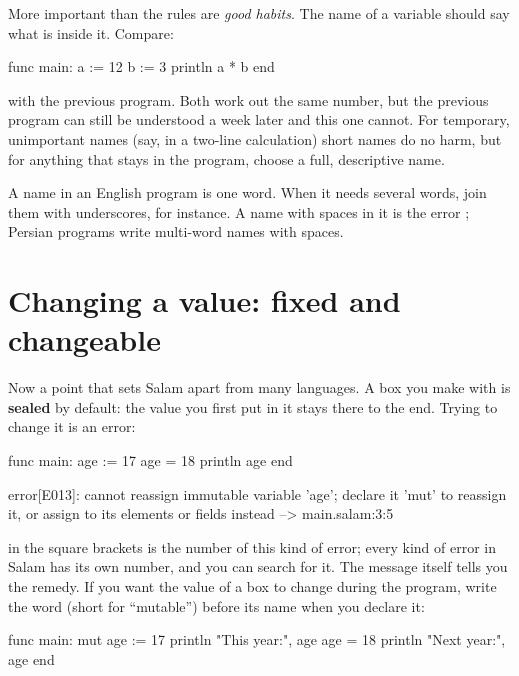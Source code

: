 More important than the rules are \emph{good habits}. The name of a variable
should say what is inside it. Compare:

\begin{salamcode}
func main:
    a := 12
    b := 3
    println a * b
end
\end{salamcode}

with the previous program. Both work out the same number, but the previous
program can still be understood a week later and this one cannot. For
temporary, unimportant names (say, in a two-line calculation) short names do
no harm, but for anything that stays in the program, choose a full,
descriptive name.

\begin{tip}
A name in an English program is one word. When it needs several words, join
them with underscores,  for instance. A name with spaces in it
is the error ; Persian programs write multi-word names with spaces.
\end{tip}

\section{Changing a value: fixed and changeable}

Now a point that sets Salam apart from many languages. A box you make with
\code{:=} is \textbf{sealed} by default: the value you first put in it stays
there to the end. Trying to change it is an error:

\begin{salamcode}
func main:
    age := 17
    age = 18
    println age
end
\end{salamcode}

\begin{salamout}
error[E013]: cannot reassign immutable variable 'age'; declare it
'mut' to reassign it, or assign to its elements or fields instead
 --> main.salam:3:5
\end{salamout}

 in the square brackets is the number of this kind of error;
every kind of error in Salam has its own number, and you can search for it.
The message itself tells you the remedy. If you want the value of a box to
change during the program, write the word  (short for
``mutable'') before its name when you declare it:

\begin{salamcode}
func main:
    mut age := 17
    println "This year:", age
    age = 18
    println "Next year:", age
end
\end{salamcode}

